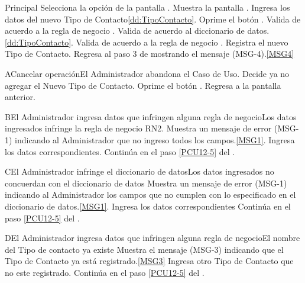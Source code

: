 	\begin{UCtrayectoria}{Principal}
			\UCpaso[\UCactor] Selecciona la opción  de la pantalla .
			\UCpaso Muestra la pantalla .
			\UCpaso [\UCactor] Ingresa los datos del nuevo Tipo de Contacto\ref{dd:TipoContacto}.
			\UCpaso [\UCactor] Oprime el botón .\label{PCU12-5}
                        \UCpaso Valida de acuerdo a la regla de negocio .  
                        \UCpaso Valida de acuerdo al diccionario de datos. \ref{dd:TipoContacto}.
                        \UCpaso Valida de acuerdo a la regla de negocio . 
			\UCpaso Registra el nuevo Tipo de Contacto.
			\UCpaso Regresa al paso 3 de mostrando el mensaje (MSG-4).\ref{MSG4}
	\end{UCtrayectoria}

	\begin{UCtrayectoriaA}{A}{Cancelar operación}{El Administrador abandona el Caso de Uso.}
			\UCpaso[\UCactor] Decide ya no agregar el Nuevo Tipo de Contacto.
			\UCpaso[\UCactor] Oprime el botón .
			\UCpaso Regresa a la pantalla anterior.
	\end{UCtrayectoriaA}

        \begin{UCtrayectoriaA}{B}{El Administrador ingresa datos que infringen alguna regla de negocio}{Los datos ingresados infringe la regla de negocio RN2.}
                        \UCpaso Muestra un mensaje de error (MSG-1) indicando al Administrador que no ingreso todos los campos.\ref{MSG1}.
			\UCpaso[\UCactor] Ingresa los datos correspondientes.
			\UCpaso Continúa en el paso \ref{PCU12-5} del .
	\end{UCtrayectoriaA}
		
        \begin{UCtrayectoriaA}{C}{El Administrador infringe el diccionario de datos}{Los datos ingresados no concuerdan con el diccionario de datos}
                        \UCpaso Muestra un mensaje de error (MSG-1) indicando al Administrador los campos que no cumplen con lo especificado en el diccionario de datos.\ref{MSG1}.
			\UCpaso[\UCactor] Ingresa los datos correspondientes
			\UCpaso Continúa en el paso \ref{PCU12-5} del .
	\end{UCtrayectoriaA}

        \begin{UCtrayectoriaA}{D}{El Administrador ingresa datos que infringen alguna regla de negocio}{El nombre del Tipo de contacto ya existe}
                        \UCpaso Muestra el mensaje (MSG-3) indicando que el Tipo de Contacto ya está registrado.\ref{MSG3}
			\UCpaso[\UCactor] Ingresa otro Tipo de Contacto que no este registrado.
			\UCpaso Continúa en el paso \ref{PCU12-5} del .
	\end{UCtrayectoriaA}



